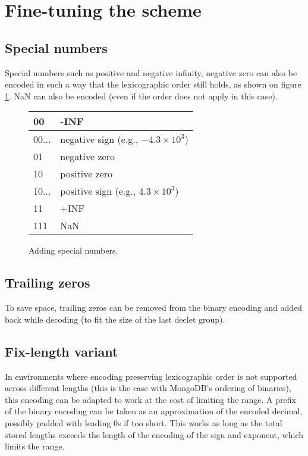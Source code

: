 \documentclass{acm_proc_article-sp}
\begin{document}
\section{Fine-tuning the scheme}
\label{section-fine-tune}

\subsection{Special numbers}

Special numbers such as positive and negative infinity, negative zero can also be encoded in such a way that the lexicographic order still holds, as shown on figure \ref{figure-sign-extended}. NaN can also be encoded (even if the order does not apply in this case).

\begin{figure}
\caption{Adding special numbers.}
\label{figure-sign-extended}
\center
\begin{tabular}{|l|l|}
\hline
00 & -INF \\
\hline
00... &  negative sign (e.g., $-4.3\times10^3$)\\
\hline
01 & negative zero \\
\hline
10 & positive zero \\
\hline
10... & positive sign (e.g., $4.3\times10^3$)\\
\hline
11 & +INF \\
\hline
111 & NaN \\
\hline
\end{tabular}
\end{figure}

\subsection{Trailing zeros}
\label{section-trailing-zeros}

To save space, trailing zeros can be removed from the binary encoding and added back while decoding (to fit the size of the last declet group).

\subsection{Fix-length variant}

In environments where encoding preserving lexicographic order is not supported across different lengths (this is the case with MongoDB's ordering of binaries), this encoding can be adapted to work at the cost of limiting the range.
A prefix of the binary encoding can be taken as an approximation of the encoded decimal, possibly padded with leading 0s if too short. This works as long as the total stored lengths exceeds the length of the encoding of the sign and exponent, which limits the range.
\end{document}
